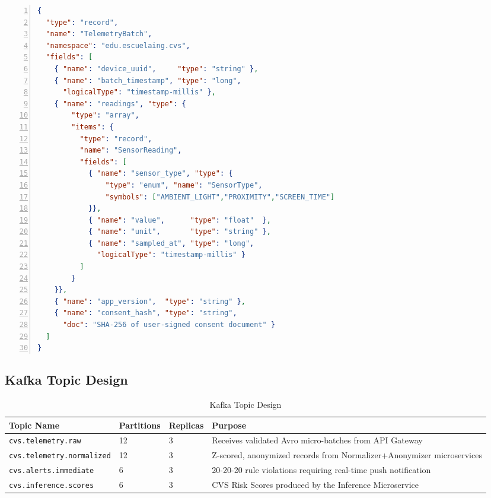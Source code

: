 \documentclass[conference]{IEEEtran}
\begin{document}
\begin{lstlisting}[language=json, caption={Avro Schema — TelemetryBatch},
  basicstyle=\ttfamily\footnotesize, frame=single, numbers=left]
{
  "type": "record",
  "name": "TelemetryBatch",
  "namespace": "edu.escuelaing.cvs",
  "fields": [
    { "name": "device_uuid",     "type": "string" },
    { "name": "batch_timestamp", "type": "long",
      "logicalType": "timestamp-millis" },
    { "name": "readings", "type": {
        "type": "array",
        "items": {
          "type": "record",
          "name": "SensorReading",
          "fields": [
            { "name": "sensor_type", "type": {
                "type": "enum", "name": "SensorType",
                "symbols": ["AMBIENT_LIGHT","PROXIMITY","SCREEN_TIME"]
            }},
            { "name": "value",      "type": "float"  },
            { "name": "unit",       "type": "string" },
            { "name": "sampled_at", "type": "long",
              "logicalType": "timestamp-millis" }
          ]
        }
    }},
    { "name": "app_version",  "type": "string" },
    { "name": "consent_hash", "type": "string",
      "doc": "SHA-256 of user-signed consent document" }
  ]
}
\end{lstlisting}

\subsection{Kafka Topic Design}

\begin{table}[H]
  \centering
  \caption{Kafka Topic Design}
  \label{tab:topics}
  \begin{tabularx}{\textwidth}{p{5cm} p{1.8cm} p{1.8cm} X}
    \toprule
    \textbf{Topic Name} & \textbf{Partitions} & \textbf{Replicas} & \textbf{Purpose} \\
    \midrule
    \texttt{cvs.telemetry.raw}        & 12 & 3 &
      Receives validated Avro micro-batches from API Gateway \\
    \texttt{cvs.telemetry.normalized} & 12 & 3 &
      Z-scored, anonymized records from Normalizer+Anonymizer microservices \\
    \texttt{cvs.alerts.immediate}     &  6 & 3 &
      20-20-20 rule violations requiring real-time push notification \\
    \texttt{cvs.inference.scores}     &  6 & 3 &
      CVS Risk Scores produced by the Inference Microservice \\
    \bottomrule
  \end{tabularx}
\end{table}
\end{document}
